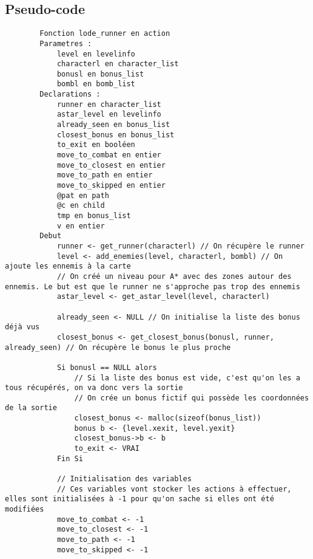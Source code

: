 \subsection{Pseudo-code}

\begin{longlisting}
    \begin{verbatim}
        Fonction lode_runner en action
        Parametres :
            level en levelinfo
            characterl en character_list
            bonusl en bonus_list
            bombl en bomb_list
        Declarations :
            runner en character_list
            astar_level en levelinfo
            already_seen en bonus_list
            closest_bonus en bonus_list
            to_exit en booléen
            move_to_combat en entier
            move_to_closest en entier
            move_to_path en entier
            move_to_skipped en entier
            @pat en path
            @c en child
            tmp en bonus_list
            v en entier
        Debut
            runner <- get_runner(characterl) // On récupère le runner
            level <- add_enemies(level, characterl, bombl) // On ajoute les ennemis à la carte
            // On créé un niveau pour A* avec des zones autour des ennemis. Le but est que le runner ne s'approche pas trop des ennemis
            astar_level <- get_astar_level(level, characterl) 

            already_seen <- NULL // On initialise la liste des bonus déjà vus
            closest_bonus <- get_closest_bonus(bonusl, runner, already_seen) // On récupère le bonus le plus proche

            Si bonusl == NULL alors
                // Si la liste des bonus est vide, c'est qu'on les a tous récupérés, on va donc vers la sortie
                // On crée un bonus fictif qui possède les coordonnées de la sortie
                closest_bonus <- malloc(sizeof(bonus_list))
                bonus b <- {level.xexit, level.yexit}
                closest_bonus->b <- b
                to_exit <- VRAI
            Fin Si

            // Initialisation des variables
            // Ces variables vont stocker les actions à effectuer, elles sont initialisées à -1 pour qu'on sache si elles ont été modifiées
            move_to_combat <- -1
            move_to_closest <- -1
            move_to_path <- -1
            move_to_skipped <- -1


\end{verbatim}
\end{longlisting}
